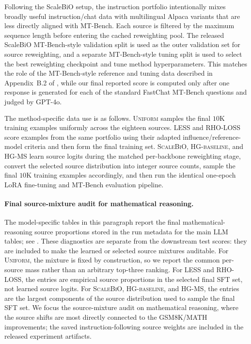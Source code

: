 \documentclass{article}
\theoremstyle{normaltheorem}
\begin{document}
Following the ScaleBiO setup, the instruction portfolio intentionally mixes broadly useful instruction/chat data with multilingual Alpaca variants that are less directly aligned with MT-Bench. Each source is filtered by the maximum sequence length before entering the cached reweighting pool. The released ScaleBiO MT-Bench-style validation split is used as the outer validation set for source reweighting, and a separate MT-Bench-style tuning split is used to select the best reweighting checkpoint and tune method hyperparameters. This matches the role of the MT-Bench-style reference and tuning data described in Appendix~B.2 of \citet{pan2025scalebio}, while our final reported score is computed only after one response is generated for each of the standard FastChat MT-Bench questions and judged by GPT-4o.

The method-specific data use is as follows. \textsc{Uniform} samples the final $10$K training examples uniformly across the eighteen sources. \textsc{LESS} and \textsc{RHO-LOSS} score examples from the same portfolio using their adapted influence/reference-model criteria and then form the final training set. \textsc{ScaleBiO}, \textsc{HG-baseline}, and \textsc{HG-MS} learn source logits during the matched per-backbone reweighting stage, convert the selected source distribution into integer source counts, sample the final $10$K training examples accordingly, and then run the identical one-epoch LoRA fine-tuning and MT-Bench evaluation pipeline.

\paragraph{Final source-mixture audit for mathematical reasoning.}
The model-specific tables in this paragraph report the final mathematical-reasoning source proportions stored in the run
metadata for the main LLM tables; see
.
These diagnostics are separate from the downstream test scores: they are included to make the learned or selected source
mixtures auditable. For \textsc{Uniform}, the mixture is fixed by construction, so we report the common per-source mass
rather than an arbitrary top-three ranking. For \textsc{LESS} and \textsc{RHO-LOSS}, the entries are empirical source
proportions in the selected final SFT set, not learned source logits. For \textsc{ScaleBiO}, \textsc{HG-baseline}, and
\textsc{HG-MS}, the entries are the largest components of the source distribution used to sample the final SFT set.
We focus the source-mixture audit on mathematical reasoning, where the source shifts are most directly connected to the
GSM8K/MATH improvements; the saved instruction-following source weights are included in the released experiment artifacts.
\end{document}
